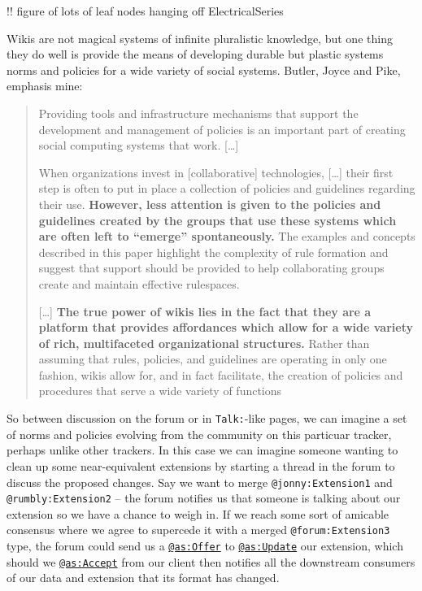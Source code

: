 \documentclass[10pt]{tufte-book}
\begin{document}
!! figure of lots of leaf nodes hanging off ElectricalSeries

Wikis are not magical systems of infinite pluralistic knowledge, but one
thing they do well is provide the means of developing durable but
plastic systems norms and policies for a wide variety of social systems.
Butler, Joyce and Pike, emphasis mine:

\begin{quote}
Providing tools and infrastructure mechanisms that support the
development and management of policies is an important part of creating
social computing systems that work. {[}\ldots{]}

When organizations invest in {[}collaborative{]} technologies,
{[}\ldots{]} their first step is often to put in place a collection of
policies and guidelines regarding their use. \textbf{However, less
attention is given to the policies and guidelines created by the groups
that use these systems which are often left to ``emerge''
spontaneously.} The examples and concepts described in this paper
highlight the complexity of rule formation and suggest that support
should be provided to help collaborating groups create and maintain
effective rulespaces.

{[}\ldots{]} \textbf{The true power of wikis lies in the fact that they
are a platform that provides affordances which allow for a wide variety
of rich, multifaceted organizational structures.} Rather than assuming
that rules, policies, and guidelines are operating in only one fashion,
wikis allow for, and in fact facilitate, the creation of policies and
procedures that serve a wide variety of functions \citep{butlerDonLookNow2008} 
\end{quote}

So between discussion on the forum or in \texttt{Talk:}-like pages, we
can imagine a set of norms and policies evolving from the community on
this particuar tracker, perhaps unlike other trackers. In this case we
can imagine someone wanting to clean up some near-equivalent extensions
by starting a thread in the forum to discuss the proposed changes. Say
we want to merge \texttt{@jonny:Extension1} and
\texttt{@rumbly:Extension2} -- the forum notifies us that someone is
talking about our extension so we have a chance to weigh in. If we reach
some sort of amicable consensus where we agree to supercede it with a
merged \texttt{@forum:Extension3} type, the forum could send us a
\href{https://www.w3.org/TR/activitystreams-vocabulary/\#dfn-offer}{\texttt{@as:Offer}}
to
\href{https://www.w3.org/TR/activitystreams-vocabulary/\#dfn-update}{\texttt{@as:Update}}
our extension, which should we
\href{https://www.w3.org/TR/activitystreams-vocabulary/\#dfn-accept}{\texttt{@as:Accept}}
from our client then notifies all the downstream consumers of our data
and extension that its format has changed.
\end{document}
